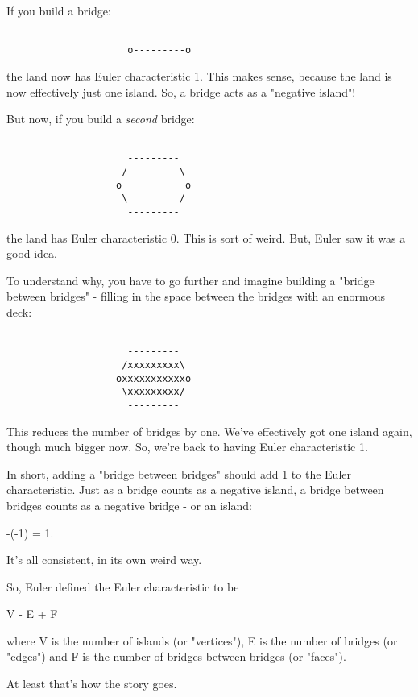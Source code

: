 If you build a bridge:


\begin{verbatim}

                     o---------o
\end{verbatim}
    

the land now has Euler characteristic 1.  This makes sense, because
the land is now effectively just one island.  So, a bridge acts as a
"negative island"!

But now, if you build a \emph{second} bridge:


\begin{verbatim}

                     --------- 
                    /         \
                   o           o
                    \         /
                     ---------
\end{verbatim}
    
the land has Euler characteristic 0.  This is sort of weird.  But, Euler
saw it was a good idea.

To understand why, you have to go further and imagine building a
"bridge between bridges" - filling in the space between the
bridges with an enormous deck:


\begin{verbatim}

                     --------- 
                    /xxxxxxxxx\
                   oxxxxxxxxxxxo
                    \xxxxxxxxx/
                     ---------
\end{verbatim}
    

This reduces the number of bridges by one.  We've effectively got one
island again, though much bigger now.  So, we're back to having Euler
characteristic 1.

In short, adding a "bridge between bridges" should add 1 to
the Euler characteristic.  Just as a bridge counts as a negative
island, a bridge between bridges counts as a negative bridge - or an
island:

-(-1) = 1.  

It's all consistent, in its own weird way.

So, Euler defined the Euler characteristic to be 

V - E + F

where V is the number of islands (or "vertices"), E is the
number of bridges (or "edges") and F is the number of
bridges between bridges (or "faces").

At least that's how the story goes.  

